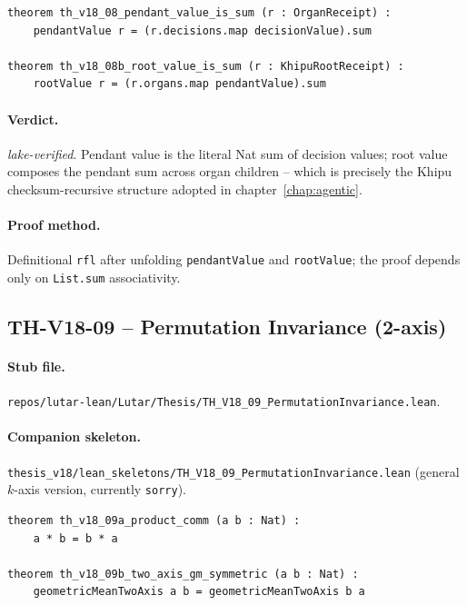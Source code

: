 \begin{theorem}[TH-V18-08, pendant value = sum of decision values -- verbatim Lean]
\label{thm:thv18-08}
\begin{verbatim}
theorem th_v18_08_pendant_value_is_sum (r : OrganReceipt) :
    pendantValue r = (r.decisions.map decisionValue).sum

theorem th_v18_08b_root_value_is_sum (r : KhipuRootReceipt) :
    rootValue r = (r.organs.map pendantValue).sum
\end{verbatim}
\end{theorem}

\paragraph{Verdict.} \emph{lake-verified}. Pendant value is the
literal Nat sum of decision values; root value composes the pendant
sum across organ children -- which is precisely the Khipu
checksum-recursive structure adopted in chapter~\ref{chap:agentic}.

\paragraph{Proof method.} Definitional \texttt{rfl} after unfolding
\texttt{pendantValue} and \texttt{rootValue}; the proof depends only
on \texttt{List.sum} associativity.

\subsection{TH-V18-09 -- Permutation Invariance (2-axis)}
\label{sub:thv18-09}

\paragraph{Stub file.}
\texttt{repos/lutar-lean/Lutar/Thesis/TH\_V18\_09\_PermutationInvariance.lean}.

\paragraph{Companion skeleton.}
\texttt{thesis\_v18/lean\_skeletons/TH\_V18\_09\_PermutationInvariance.lean}
(general $k$-axis version, currently \texttt{sorry}).

\begin{theorem}
\label{thm:thv18-09}
\begin{verbatim}
theorem th_v18_09a_product_comm (a b : Nat) :
    a * b = b * a

theorem th_v18_09b_two_axis_gm_symmetric (a b : Nat) :
    geometricMeanTwoAxis a b = geometricMeanTwoAxis b a
\end{verbatim}
\end{theorem}

